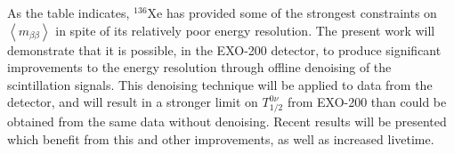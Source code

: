 As the table indicates, $^{136}$Xe has provided some of the strongest constraints on $\left< m_{\beta\beta}\right>$ in spite of its relatively poor energy resolution.  The present work will demonstrate that it is possible, in the EXO-200 detector, to produce significant improvements to the energy resolution through offline denoising of the scintillation signals.  This denoising technique will be applied to data from the detector, and will result in a stronger limit on $T_{1/2}^{0\nu}$ from EXO-200 than could be obtained from the same data without denoising.  Recent results will be presented which benefit from this and other improvements, as well as increased livetime.
